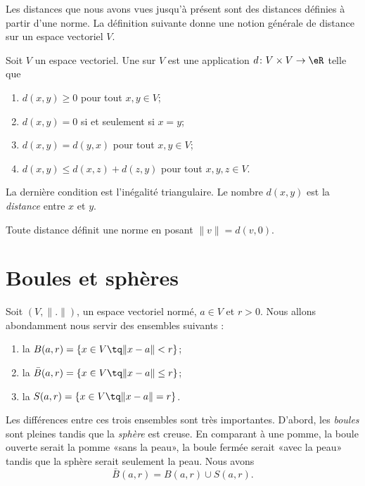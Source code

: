 Les distances que nous avons vues jusqu'à présent sont des distances définies à partir d'une norme. La définition suivante donne une notion générale de distance sur un espace vectoriel \( V\).

\begin{definition}
    Soit \( V\) un espace vectoriel. Une  sur \( V\) est une application \( d\colon V\times V\to \eR\) telle que
    \begin{enumerate}
        \item
            \( d(x,y)\geq 0\) pour tout \( x,y\in V\);
        \item
            \( d(x,y)=0\) si et seulement si \( x=y\);
        \item
            \( d(x,y)=d(y,x)\) pour tout \( x,y\in V\);
        \item
            \( d(x,y)\leq d(x,z)+d(z,y)\) pour tout \( x,y,z\in V\).
    \end{enumerate}
    La dernière condition est l'inégalité triangulaire. Le nombre \( d(x,y)\) est la \emph{distance} entre \( x\) et \( y\).
\end{definition}
Toute distance définit une norme en posant \( \| v \|=d(v,0)\).

\section{Boules et sphères}\label{Sect_boules}

\begin{definition}
	Soit $(V,\| . \|)$, un espace vectoriel normé, $a\in V$ et $r>0$. Nous allons abondamment nous servir des ensembles suivants :
	\begin{enumerate}

		\item
			la  $B(a,r)=\{ x\in V\tq \| x-a \|<r \}$;
		\item
			la  $\bar B(a,r)=\{ x\in V\tq \| x-a \|\leq r \}$;
		\item
			la  $S(a,r)=\{ x\in V\tq \| x-a \|=r \}$.

	\end{enumerate}
\end{definition}
Les différences entre ces trois ensembles sont très importantes. D'abord, les \emph{boules} sont pleines tandis que la \emph{sphère} est creuse. En comparant à une pomme, la boule ouverte serait la pomme «sans la peau», la boule fermée serait «avec la peau» tandis que la sphère serait seulement la peau. Nous avons
\begin{equation}
	\bar B(a,r)=B(a,r)\cup S(a,r).
\end{equation}

